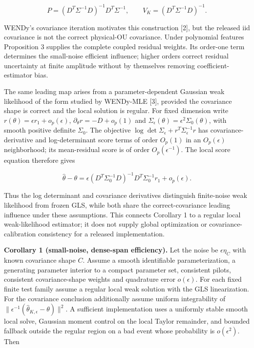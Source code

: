 \documentclass[
  american,
  11pt,
]{article}
\begin{document}
\[
P=(D^T\Sigma^{-1}D)^{-1}D^T\Sigma^{-1},\qquad
V_K=(D^T\Sigma^{-1}D)^{-1}.
\]

WENDy's covariance iteration motivates this construction {[}2{]}, but
the released iid covariance is not the correct physical-OU covariance.
Under polynomial features Proposition 3 supplies the complete coupled
residual weights. Its order-one term determines the small-noise
efficient influence; higher orders correct residual uncertainty at
finite amplitude without by themselves removing coefficient-estimator
bias.

The same leading map arises from a parameter-dependent Gaussian weak
likelihood of the form studied by WENDy-MLE {[}3{]}, provided the
covariance shape is correct and the local solution is regular. For fixed
dimension write \(r(\theta)=\epsilon r_1+o_p(\epsilon)\),
\(\partial_\theta r=-D+o_p(1)\) and
\(\Sigma_\epsilon(\theta)=\epsilon^2\Sigma_0(\theta)\), with smooth
positive definite \(\Sigma_0\). The objective
\(\log\det\Sigma_\epsilon+r^T\Sigma_\epsilon^{-1}r\) has
covariance-derivative and log-determinant score terms of order
\(O_p(1)\) in an \(O_p(\epsilon)\) neighborhood; its mean-residual score
is of order \(O_p(\epsilon^{-1})\). The local score equation therefore
gives

\[
\widehat\theta-\theta=\epsilon
(D^T\Sigma_0^{-1}D)^{-1}D^T\Sigma_0^{-1}r_1+o_p(\epsilon).
\]

Thus the log determinant and covariance derivatives distinguish
finite-noise weak likelihood from frozen GLS, while both share the
correct-covariance leading influence under these assumptions. This
connects Corollary 1 to a regular local weak-likelihood estimator; it
does not supply global optimization or covariance-calibration
consistency for a released implementation.

\textbf{Corollary 1 (small-noise, dense-span efficiency).} Let the noise
be \(\epsilon\eta_C\) with known covariance shape \(C\). Assume a smooth
identifiable parameterization, a generating parameter interior to a
compact parameter set, consistent pilots, consistent covariance-shape
weights and quadrature error \(o(\epsilon)\). For each fixed finite test
family assume a regular local weak solution with the GLS linearization.
For the covariance conclusion additionally assume uniform integrability
of \(\|\epsilon^{-1}(\widehat\theta_{K,\epsilon}-\theta)\|^2\). A
sufficient implementation uses a uniformly stable smooth local solve,
Gaussian moment control on the local Taylor remainder, and bounded
fallback outside the regular region on a bad event whose probability is
\(o(\epsilon^2)\). Then
\end{document}
